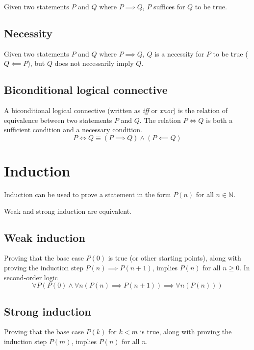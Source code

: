 \documentclass[a4paper]{article}
\begin{document}
Given two statements \(P\) and \(Q\) where \(P \implies Q\),
\(P\) suffices for \(Q\) to be true.

\subsection{Necessity}

Given two statements \(P\) and \(Q\) where \(P \implies Q\),
\(Q\) is a necessity for \(P\) to be true (\(Q \impliedby P\)), but
\(Q\) does not necessarily imply \(Q\).

\subsection{Biconditional logical connective}

A biconditional logical connective (written as \textit{iff} or \textit{xnor})
is the relation of equivalence
between two statements \(P\) and \(Q\).
The relation \(P \iff Q\) is both a sufficient condition and
a necessary condition.
\[
    P \iff Q
    \equiv
    (P \implies Q) \land (P \impliedby Q)
\]

\pagebreak

\section{Induction}

Induction can be used to prove a statement in the form \(P(n)\)
for all \(n \in \mathbb{N}\).

Weak and strong induction are equivalent.

\subsection{Weak induction}

Proving that the base case \(P(0)\) is true (or other starting points),
along with proving the induction step \(P(n) \implies P(n+1)\), implies \(P(n)\)
for all \(n \geq 0\). In second-order logic
\[
    \forall P \left(
        P(0) \land \forall n \left( P(n) \implies P(n+1) \right)
        \implies \forall n \left( P(n) \right)
    \right)
\]

\subsection{Strong induction}

Proving that the base case \(P(k)\) for \(k < m\) is true, along with
proving the induction step \(P(m)\), implies \(P(n)\)
for all \(n\).
\end{document}
